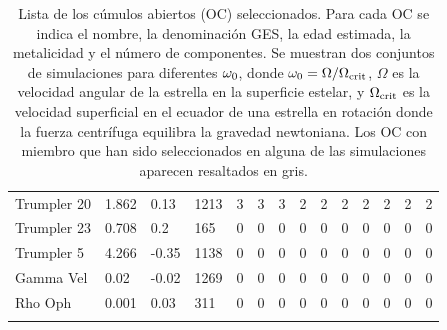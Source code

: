 \begin{longtable}[c]{|l l l l || c c c c c c c c c c|}
		\rowcolor{lightgray}
		Trumpler 20 & 1.862 & 0.13 & 1213 & 3 & 3 & 3 & 2 & 2 & 2 & 2 & 2 & 2 & 2\\
		Trumpler 23 & 0.708 & 0.2 & 165 & 0 & 0 & 0 & 0 & 0 & 0 & 0 & 0 & 0 & 0\\
		Trumpler 5 & 4.266 & -0.35 & 1138 & 0 & 0 & 0 & 0 & 0 & 0 & 0 & 0 & 0 & 0\\
		Gamma Vel & 0.02 & -0.02 & 1269 & 0 & 0 & 0 & 0 & 0 & 0 & 0 & 0 & 0 & 0\\
		Rho Oph & 0.001 & 0.03 & 311 & 0 & 0 & 0 & 0 & 0 & 0 & 0 & 0 & 0 & 0\\           
		\hline
	\caption{Lista de los cúmulos abiertos (OC) seleccionados. Para cada OC se indica el nombre, la denominación GES, la edad estimada, la metalicidad y el número de componentes. Se muestran dos conjuntos de simulaciones para diferentes $\omega_{\mathrm{0}}$, donde $\omega_{\mathrm{0}} = \Omega / \Omega_{\mathrm{crit}}$, $\Omega$ es la velocidad angular de la estrella en la superficie estelar, y $\Omega_{\mathrm{crit}}$ es la velocidad superficial en el ecuador de una estrella en rotación donde la fuerza centrífuga equilibra la gravedad newtoniana. Los OC con miembro que han sido seleccionados en alguna de las simulaciones aparecen resaltados en gris.}
	\label{tab:oc_full_list}
\end{longtable}
\newpage
{}
\recalctypearea

\endinput
